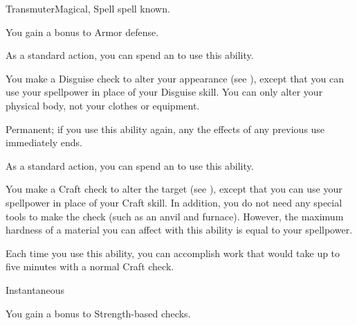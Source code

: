     \begin{feat}{Transmuter}{Magical, Spell}
        \featpre {} spell known.
        \featben

         You gain a  bonus to Armor defense.

         As a standard action, you can spend an  to use this ability.
        \begin{ability}
            \begin{spelleffects}
                \spelleffect You make a Disguise check to alter your appearance (see ), except that you can use your spellpower in place of your Disguise skill.
                You can only alter your physical body, not your clothes or equipment.
            \end{spelleffects}
            \spelldur Permanent; if you use this ability again, any the effects of any previous use immediately ends.
        \end{ability}

         As a standard action, you can spend an  to use this ability.
        \begin{ability}
            \begin{spelltargetinginfo}
            \end{spelltargetinginfo}
            \begin{spelleffects}
                \spelleffect You make a Craft check to alter the target (see ), except that you can use your spellpower in place of your Craft skill.
                In addition, you do not need any special tools to make the check (such as an anvil and furnace).
                However, the maximum hardness of a material you can affect with this ability is equal to your spellpower.

                Each time you use this ability, you can accomplish work that would take up to five minutes with a normal Craft check.
            \end{spelleffects}
            \spelldur Instantaneous
        \end{ability}

         You gain a  bonus to Strength-based checks.


\end{feat}
